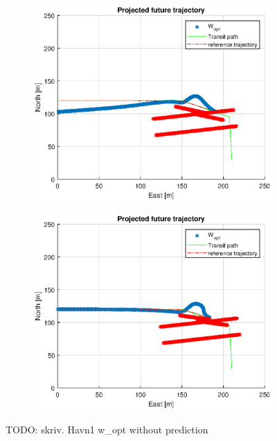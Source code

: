 \begin{figure}
\begin{subfigure}[b]{0.499\textwidth}
    \end{subfigure}
    \hfill
    \\
    \begin{subfigure}[b]{0.49\textwidth}
        \centering
        \includegraphics[width=\textwidth]{Images/Figures/Havn1/Simple1_f999_Frame6}
    \end{subfigure}
    \hfill
    \begin{subfigure}[b]{0.499\textwidth}
        \centering
        \includegraphics[width=\textwidth]{Images/Figures/Havn1/Simple1_f999_Frame7}
    \end{subfigure}
    \hfill
    \caption{TODO: skriv. Havn1 w\_opt without prediction}
\end{figure}

